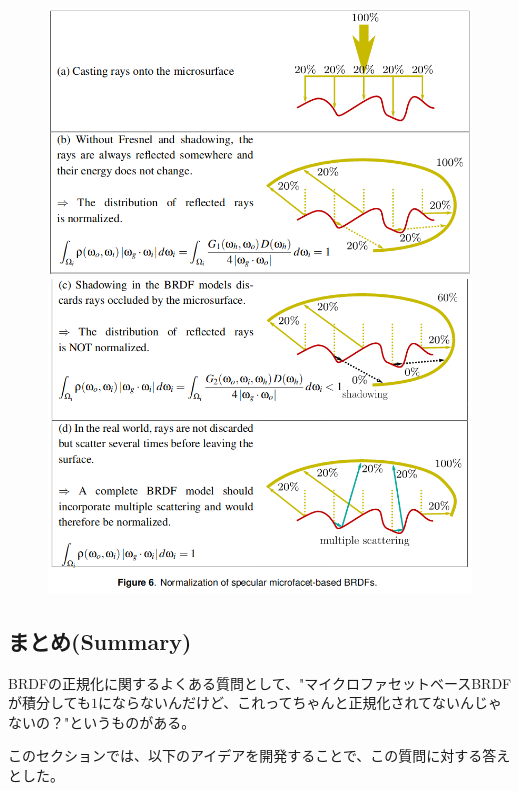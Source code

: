 \documentclass[a4j,xelatex,ja=standard]{bxjsarticle}
\begin{document}
\begin{figure}
    \includegraphics[width=\textwidth]{Figure6_1.png}
    \includegraphics[width=\textwidth]{Figure6_2.png}
    \caption{}
    \label{fig:6}
\end{figure}

\subsection{まとめ(Summary)}

BRDFの正規化に関するよくある質問として、"マイクロファセットベースBRDFが積分しても$1$にならないんだけど、これってちゃんと正規化されてないんじゃないの？"というものがある。

このセクションでは、以下のアイデアを開発することで、この質問に対する答えとした。
\end{document}
